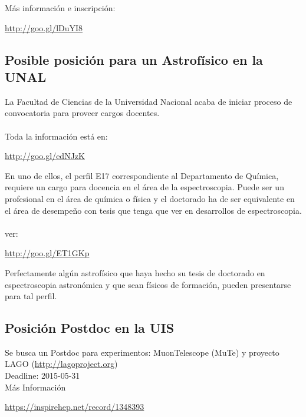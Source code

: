 \documentclass{book}
\begin{document}
Más información e inscripción:
\begin{center}
\url{http://goo.gl/lDuYI8}
\end{center}

\subsection{Posible posición para un Astrofísico en la UNAL}

La Facultad de Ciencias de la Universidad Nacional  acaba de iniciar proceso de convocatoria para proveer cargos docentes.\\
\\
Toda la información está en:
\begin{center}
\url{http://goo.gl/edNJzK}
\end{center}
En uno de ellos, el perfil E17 correspondiente al Departamento de Química, requiere un cargo para docencia en el área de la espectroscopia. Puede ser un profesional en el área de   química o  física y el doctorado ha de ser equivalente en el área de desempeño con tesis que tenga que ver en desarrollos de espectroscopia.\\
\\
ver:
\begin{center}
\url{http://goo.gl/ET1GKp}
\end{center}
Perfectamente algún astrofísico que haya hecho su tesis de doctorado en espectroscopia astronómica y que sean físicos de formación, pueden presentarse para tal perfil.

\subsection{Posición Postdoc en la UIS}

Se busca un Postdoc para experimentos: MuonTelescope (MuTe) y proyecto LAGO (\url{http://lagoproject.org})\\

Deadline: 2015-05-31\\

Más Información
\begin{center}
\url{https://inspirehep.net/record/1348393}
\end{center}
\end{document}
